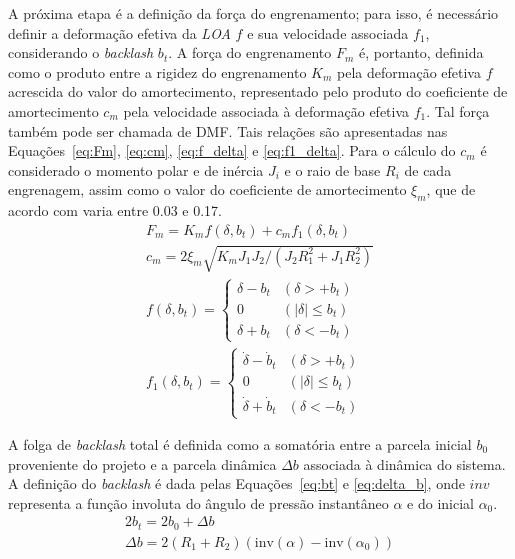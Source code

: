 A próxima etapa é a definição da força do engrenamento; para isso, é necessário definir a deformação efetiva da \textit{LOA} $f$ e sua velocidade associada $f_1$, considerando o \textit{backlash} $b_t$. A força do engrenamento $F_m$ é, portanto, definida como o produto entre a rigidez do engrenamento $K_m$ pela deformação efetiva $f$ acrescida do valor do amortecimento, representado pelo produto do coeficiente de amortecimento $c_m$ pela velocidade associada à deformação efetiva $f_1$. Tal força também pode ser chamada de DMF. Tais relações são apresentadas nas Equações~\ref{eq:Fm}, \ref{eq:cm}, \ref{eq:f_delta} e \ref{eq:f1_delta}.
Para o cálculo do $c_m$ é considerado o momento polar e de inércia $J_i$ e o raio de base $R_i$ de cada engrenagem, assim como o valor do coeficiente de amortecimento  $\xi_m$, que de acordo com  varia entre 0.03 e 0.17.
\begin{gather}
	F_m = K_m f(\delta, b_t) + c_m f_1(\delta, b_t)
	\label{eq:Fm}
\\
	c_m = 2\xi_m \sqrt{K_m J_1 J_2 / (J_2 R_1^2 + J_1 R_2^2)}
	\label{eq:cm}
\\
	f(\delta, b_t) = \begin{cases} 
		\delta - b_t & (\delta > +b_t) \\
		0 & (|\delta| \le b_t) \\
		\delta + b_t & (\delta < -b_t)
	\end{cases}
	\label{eq:f_delta}
\\
	f_1(\delta, b_t) = \begin{cases} 
		\dot{\delta} - \dot{b}_t & (\delta > +b_t) \\
		0 & (|\delta| \le b_t) \\
		\dot{\delta} + \dot{b}_t & (\delta < -b_t)
	\end{cases}
	\label{eq:f1_delta}
\end{gather}

A folga de \textit{backlash} total é definida como a somatória entre a parcela inicial $b_0$ proveniente do projeto e a parcela dinâmica $\Delta b$ associada à dinâmica do sistema. A definição do \textit{backlash} é dada pelas Equações~\ref{eq:bt} e \ref{eq:delta_b}, onde $inv$ representa a função involuta do  ângulo de pressão instantâneo $\alpha$ e do inicial $\alpha_0$.
\begin{gather}
	2b_t = 2b_0 + \Delta b %
	\label{eq:bt}
\\
	\Delta b = 2(R_1 + R_2)(\mathrm{inv}(\alpha) - \mathrm{inv}(\alpha_0))
	\label{eq:delta_b}
\end{gather}

